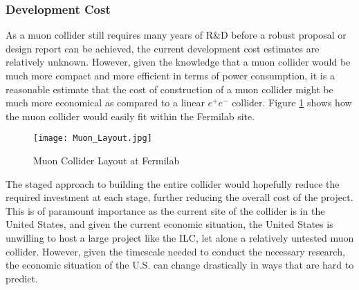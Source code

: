 \subsubsection{Development Cost}
 
As a muon collider still requires many years of R\&D before a robust proposal or design report can be achieved, the current development cost estimates are relatively unknown. However, given the knowledge that a muon collider would be much more compact and more efficient in terms of power consumption, it is a reasonable estimate that the cost of construction of a muon collider might be much more economical as compared to a linear $e^+ e^-$ collider. Figure \ref{Muon:Layout} shows how the muon collider would easily fit within the Fermilab site.

\begin{figure}[!htb]
\centering
\texttt{[image: Muon\_Layout.jpg]}
\caption{Muon Collider Layout at Fermilab}
\label{Muon:Layout}
\end{figure}
 
The staged approach to building the entire collider would hopefully reduce the required investment at each stage, further reducing the overall cost of the project. This is of paramount importance as the current site of the collider is in the United States, and given the current economic situation, the United States is unwilling to host a large project like the ILC, let alone a relatively untested muon collider. However, given the timescale needed to conduct the necessary research, the economic situation of the U.S. can change drastically in ways that are hard to predict.